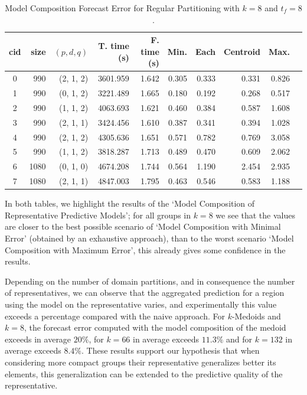 \begin{table}[h]
	\centering
	\small
	\begin{tabular}{|c|r|r|r|r|r|r|r|r|r|}
		\hline
        cid & size & $(p, d, q)$ & T. time (s) & F. time (s) & Min. & Each & \cellcolor{red!20}Centroid & Max. \\
        \hline
        0 &  990 & (2, 1, 2) &  3601.959 & 1.642 & 0.305 & 0.333 & \cellcolor{red!20}0.331 & 0.826 \\
        1 &  990 & (0, 1, 2) &  3221.489 & 1.665 & 0.180 & 0.192 & \cellcolor{red!20}0.268 & 0.517 \\
        2 &  990 & (1, 1, 2) &  4063.693 & 1.621 & 0.460 & 0.384 & \cellcolor{red!20}0.587 & 1.608 \\
        3 &  990 & (2, 1, 1) &  3424.456 & 1.610 & 0.387 & 0.341 & \cellcolor{red!20}0.394 & 1.028 \\
        4 &  990 & (2, 1, 2) &  4305.636 & 1.651 & 0.571 & 0.782 & \cellcolor{red!20}0.769 & 3.058 \\
        5 &  990 & (1, 1, 2) &  3818.287 & 1.713 & 0.489 & 0.470 & \cellcolor{red!20}0.609 & 2.062 \\
        6 & 1080 & (0, 1, 0) &  4674.208 & 1.744 & 0.564 & 1.190 & \cellcolor{red!20}2.454 & 2.935 \\
        7 & 1080 & (2, 1, 1) &  4847.003 & 1.795 & 0.463 & 0.546 & \cellcolor{red!20}0.583 & 1.188 \\ \hline
	\end{tabular}
	\caption{Model Composition Forecast Error for Regular Partitioning with $k=8$ and $t_{f} =8$.}
	\label{Table:ForecastErrorRegulark10}
\end{table}

In both tables, we highlight the results of the `Model Composition of Representative Predictive Models'; for all groups in $k=8$ we see that the values are closer to the best possible scenario of `Model Composition with Minimal Error' (obtained by an exhaustive approach), than to the worst scenario `Model Composition with Maximum Error', this already gives some confidence in the results. 

Depending on the number of domain partitions, and in consequence the number of representatives, we can observe that the aggregated prediction for a region using the model on the representative varies, and experimentally this value exceeds a percentage compared with the naive approach. For $k$-Medoids and $k=8$, the forecast error computed with the model composition of the medoid exceeds in average $20\%$, for $k=66$ in average exceeds $11.3\%$ and for $k=132$ in average exceeds $8.4\%$. These results support our hypothesis that when considering more compact groups their representative generalizes better its elements, this generalization can be extended to the predictive quality of the representative.

